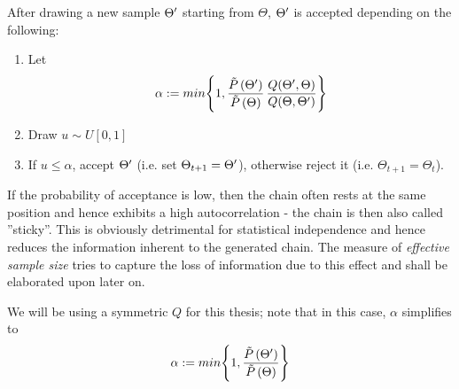 	After drawing a new sample $\Theta^\prime$ starting from $\Theta$, $\Theta^\prime$ is accepted depending on the following:
	\begin{enumerate}
		\item Let 
		\[
			\alpha := min \Bigg\{ 1,  \frac{\tilde{P}\left(\Theta^\prime\right)}{\tilde{P}\left(\Theta\right)} \, \frac{Q(\Theta^\prime, \Theta)}{Q(\Theta, \Theta^\prime)}			
			\Bigg\}
		\]
		\item Draw $u \sim U[0, 1]$
		\item If $u \leq \alpha$, accept $\Theta^\prime$ (i.e. set $\Theta_{t+1} = \Theta^\prime$), otherwise reject it (i.e. $\Theta_{t+1} = \Theta_t$). 
	\end{enumerate} 
	If the probability of acceptance is low, then the chain often rests at the same position and hence exhibits a high autocorrelation - the chain is then also called ''sticky''. This is obviously detrimental for statistical independence and hence reduces the information inherent to the generated chain. 
	The measure of \textit{effective sample size} tries to capture the loss of information due to this effect and shall be elaborated upon later on.

	We will be using a symmetric $Q$ for this thesis; note that in this case,  $\alpha$ simplifies to 
	\[
			\alpha := min \Bigg\{ 1,  \frac{\tilde{P}\left(\Theta^\prime\right)}{\tilde{P}\left(\Theta\right)}			
		\Bigg\}
	\]
	
	
